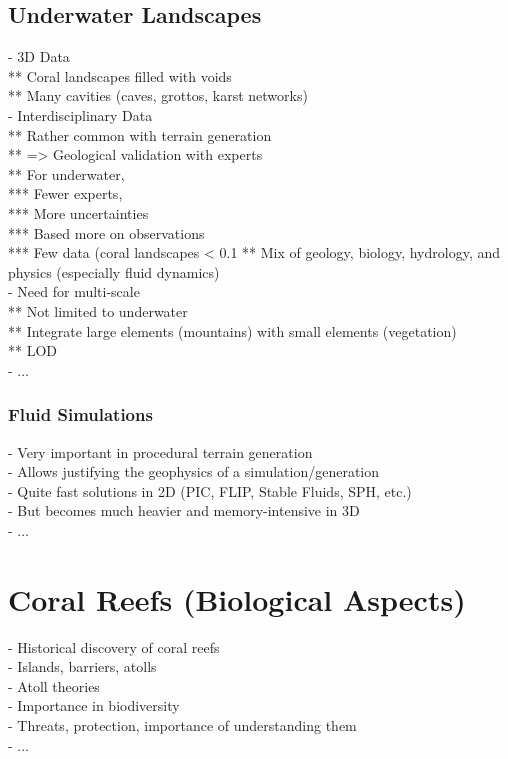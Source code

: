 \subsection{Underwater Landscapes}
- 3D Data \\
** Coral landscapes filled with voids \\
** Many cavities (caves, grottos, karst networks) \\
- Interdisciplinary Data \\
** Rather common with terrain generation \\
** => Geological validation with experts \\
** For underwater, \\
*** Fewer experts, \\
*** More uncertainties \\
*** Based more on observations \\
*** Few data (coral landscapes < 0.1%
** Mix of geology, biology, hydrology, and physics (especially fluid dynamics) \\
- Need for multi-scale \\
** Not limited to underwater \\
** Integrate large elements (mountains) with small elements (vegetation) \\
** LOD \\
- ...

\subsubsection{Fluid Simulations}
- Very important in procedural terrain generation \\
- Allows justifying the geophysics of a simulation/generation \\
- Quite fast solutions in 2D (PIC, FLIP, Stable Fluids, SPH, etc.) \\
- But becomes much heavier and memory-intensive in 3D \\
- ...

\section{Coral Reefs (Biological Aspects)}
\label{sec:introduction_biology}
- Historical discovery of coral reefs \\
- Islands, barriers, atolls \\
- Atoll theories \\
- Importance in biodiversity \\
- Threats, protection, importance of understanding them \\
- ...

